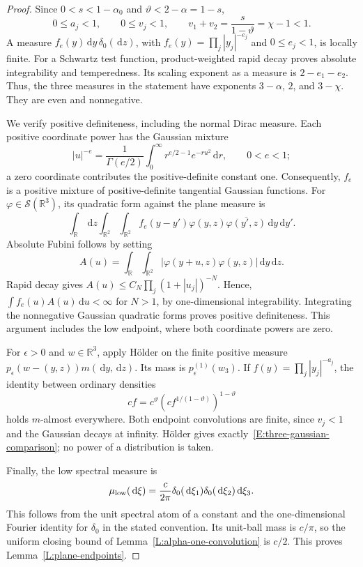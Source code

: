 \documentclass[12pt]{article}
\numberwithin{equation}{section}
\theoremstyle{definition}
\newcommand{\R}{\mathbb{R}}
\newcommand{\ud}{\,\mathrm{d}}
\begin{document}
\begin{proof}
  Since $0<s<1-\alpha_0$ and $\vartheta<2-\alpha=1-s$,
  \[
    0\le a_j<1,\qquad 0\le v_j<1,\qquad
    v_1+v_2=\frac{s}{1-\vartheta}=\chi-1<1.
  \]
  A measure $f_e(y)\ud y\,\delta_0(\ud z)$, with
  $f_e(y)=\prod_j|y_j|^{-e_j}$ and $0\le e_j<1$, is locally finite.
  For a Schwartz test function, product-weighted rapid decay proves
  absolute integrability and temperedness. Its scaling exponent as
  a measure is $2-e_1-e_2$. Thus, the three measures in the statement
  have exponents $3-\alpha$, $2$, and $3-\chi$. They are even and
  nonnegative.

  We verify positive definiteness, including the normal Dirac measure.
  Each positive coordinate power has the Gaussian mixture
  \[
    |u|^{-e}=\frac1{\Gamma(e/2)}
    \int_0^\infty r^{e/2-1}e^{-ru^2}\ud r,\qquad 0<e<1;
  \]
  a zero coordinate contributes the positive-definite constant one.
  Consequently, $f_e$ is a positive mixture of positive-definite
  tangential Gaussian functions. For $\varphi\in\mathcal S(\R^3)$,
  its quadratic form against the plane measure is
  \[
    \int_\R\ud z\int_{\R^2}\int_{\R^2}
    f_e(y-y')\varphi(y,z)\overline{\varphi(y',z)}
    \ud y\ud y'.
  \]
  Absolute Fubini follows by setting
  \[
    A(u)=\int_\R\int_{\R^2}
    |\varphi(y+u,z)\varphi(y,z)|\ud y\ud z.
  \]
  Rapid decay gives $A(u)\le C_N\prod_j(1+|u_j|)^{-N}$.
  Hence, $\int f_e(u)A(u)\ud u<\infty$ for $N>1$, by
  one-dimensional integrability. Integrating the nonnegative Gaussian
  quadratic forms proves positive definiteness. This argument includes
  the low endpoint, where both coordinate powers are zero.

  For $\epsilon>0$ and $w\in\R^3$, apply H\"older on the finite
  positive measure $p_\epsilon(w-(y,z))m(\ud y,\ud z)$.
  Its mass is $p_\epsilon^{(1)}(w_3)$. If
  $f(y)=\prod_j|y_j|^{-a_j}$, the identity between ordinary densities
  \[
    cf=c^\vartheta
    \left(cf^{1/(1-\vartheta)}\right)^{1-\vartheta}
  \]
  holds $m$-almost everywhere. Both endpoint convolutions are finite,
  since $v_j<1$ and the Gaussian decays at infinity. H\"older gives
  exactly~\eqref{E:three-gaussian-comparison}; no power of a
  distribution is taken.

  Finally, the low spectral measure is
  \[
    \mu_{\rm low}(\ud\xi)
    =\frac{c}{2\pi}\delta_0(\ud\xi_1)\delta_0(\ud\xi_2)\ud\xi_3.
  \]
  This follows from the unit spectral atom of a constant and the
  one-dimensional Fourier identity for $\delta_0$ in the stated
  convention. Its unit-ball mass is $c/\pi$, so the uniform closing
  bound of Lemma~\ref{L:alpha-one-convolution} is $c/2$.
  This proves Lemma~\ref{L:plane-endpoints}.
\end{proof}
\end{document}
